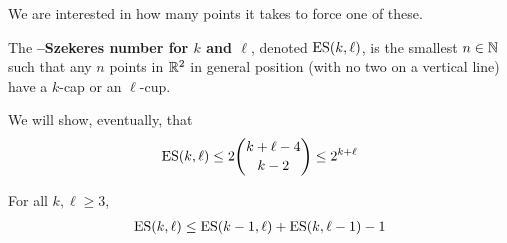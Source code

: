 We are interested in how many points it takes to force one of these.

\begin{boxdefinition}
    The \textbf{\Erdos--Szekeres number for $k$ and $\ell$}, denoted $\operatorname{ES}(k, \ell)$, is the smallest $n \in \mathbb{N}$ such that any $n$ points in $\mathbb{R}^2$ in general position (with no two on a vertical line) have a $k$-cap or an $\ell$-cup.
\end{boxdefinition}

We will show, eventually, that
\begin{align*}
    \operatorname{ES}(k, \ell) \le 2\binom{k + \ell - 4}{k - 2} \le 2^{k + \ell}
\end{align*}

\begin{boxlemma}\label{Ch6:Lemma:ES_Recursion}
    For all $k, \ell \geq 3$,
    \begin{align*}
        \operatorname{ES}(k, \ell) \le \operatorname{ES}(k - 1, \ell) + \operatorname{ES}(k, \ell - 1) - 1
    \end{align*}
\end{boxlemma}

